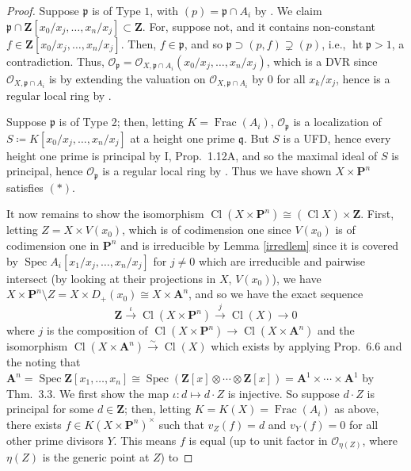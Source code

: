 \documentclass[10pt]{article}
\theoremstyle{definition}
\theoremstyle{remark}
\numberwithin{equation}{section}
\numberwithin{figure}{subsubsection}
\DeclareMathOperator{\Spec}{Spec}
\DeclareMathOperator{\Ht}{ht}
\DeclareMathOperator{\Frac}{Frac}
\DeclareMathOperator{\Cl}{Cl}
\newcommand{\OO}{\mathcal{O}}
\newcommand{\isoto}{\overset{\sim}{\to}}
\begin{document}
\begin{proof}
  \par Suppose $\mathfrak{p}$ is of Type $1$, with $(p) = \mathfrak{p} \cap A_i$ by \cite[Prop.~9.2]{AM69}. We claim $\mathfrak{p} \cap \mathbf{Z}[x_0/x_j,\ldots,x_n/x_j] \subset \mathbf{Z}$. For, suppose not, and it contains non-constant $f \in \mathbf{Z}[x_0/x_j,\ldots,x_n/x_j]$. Then, $f \in \mathfrak{p}$, and so $\mathfrak{p} \supset (p,f) \supsetneq (p)$, i.e., $\Ht \mathfrak{p} > 1$, a contradiction. Thus, $\OO_{\mathfrak{p}} = \OO_{X,\mathfrak{p} \cap A_i}(x_0/x_j,\ldots,x_n/x_j)$, which is a DVR since $\OO_{X,\mathfrak{p} \cap A_i}$ is by extending the valuation on $\OO_{X,\mathfrak{p} \cap A_i}$ by $0$ for all $x_k/x_j$, hence is a regular local ring by \cite[Prop.~9.2]{AM69}.
  \par Suppose $\mathfrak{p}$ is of Type 2; then, letting $K = \Frac(A_i)$, $\OO_{\mathfrak{p}}$ is a localization of $S \coloneqq K[x_0/x_j,\ldots,x_n/x_j]$ at a height one prime $\mathfrak{q}$. But $S$ is a UFD, hence every height one prime is principal by I, Prop.~1.12A, and so the maximal ideal of $S$ is principal, hence $\OO_{\mathfrak{p}}$ is a regular local ring by \cite[Prop.~9.2]{AM69}. Thus we have shown $X \times \mathbf{P}^n$ satisfies $(*)$.
  \par It now remains to show the isomorphism $\Cl(X \times \mathbf{P}^n) \cong (\Cl X) \times \mathbf{Z}$. First, letting $Z = X \times V(x_0)$, which is of codimension one since $V(x_0)$ is of codimension one in $\mathbf{P}^n$ and is irreducible by Lemma \ref{irredlem} since it is covered by $\Spec A_i[x_1/x_j,\ldots,x_n/x_j]$ for $j\ne0$ which are irreducible and pairwise intersect (by looking at their projections in $X$, $V(x_0)$), we have $X \times \mathbf{P}^n \setminus Z = X \times D_+(x_0) \cong X \times \mathbf{A}^n$, and so we have the exact sequence
  \begin{equation*}
    \mathbf{Z} \overset{\iota}{\longrightarrow} \Cl(X \times \mathbf{P}^n) \overset{j}{\longrightarrow} \Cl(X) \longrightarrow 0
  \end{equation*}
  where $j$ is the composition of $\Cl(X \times \mathbf{P}^n) \to \Cl(X \times \mathbf{A}^n)$ and the isomorphism $\Cl(X \times \mathbf{A}^n) \isoto \Cl(X)$ which exists by applying Prop.~6.6 and the noting that $\mathbf{A}^n = \Spec \mathbf{Z}[x_1,\ldots,x_n] \cong \Spec (\mathbf{Z}[x] \otimes \cdots \otimes \mathbf{Z}[x]) = \mathbf{A}^1 \times \cdots \times \mathbf{A}^1$ by Thm.~3.3. We first show the map $\iota\colon d \mapsto d \cdot Z$ is injective. So suppose $d \cdot Z$ is principal for some $d \in \mathbf{Z}$; then, letting $K = K(X) = \Frac(A_i)$ as above, there exists $f \in K(X \times \mathbf{P}^n)^\times$ such that $v_Z(f) = d$ and $v_Y(f) = 0$ for all other prime divisors $Y$. This means $f$ is equal (up to unit factor in $\OO_{\eta(Z)}$, where $\eta(Z)$ is the generic point at $Z$) to

\end{proof}
\end{document}
